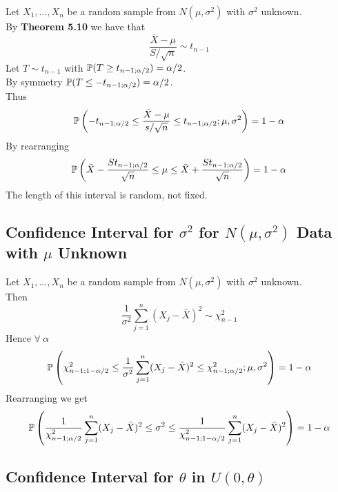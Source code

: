 \documentclass[11pt,a4paper]{article}
\begin{document}
Let $X_1,\dots,X_n$ be a random sample from $N(\mu,\sigma^2)$ with $\sigma^2$ unknown.\\
By \textbf{Theorem 5.10} we have that
$$\dfrac{\bar{X}-\mu}{S/\sqrt{n}}\sim t_{n-1}$$
Let $T\sim t_{n-1}$ with $\mathbb{P}(T\geq t_{n-1;\alpha/2})=\alpha/2$.\\
By symmetry $\mathbb{P}(T\leq-t_{n-1;\alpha/2})=\alpha/2$.\\
Thus
$$\mathbb{P}\left(-t_{n-1;\alpha/2}\leq\frac{\bar{X}-\mu}{s/\sqrt{n}}\leq t_{n-1;\alpha/2};\mu,\sigma^2\right)=1-\alpha$$
By rearranging
$$\mathbb{P}\left(\bar{X}-\frac{St_{n-1;\alpha/2}}{\sqrt{n}}\leq\mu\leq\bar{X}+\frac{St_{n-1;\alpha/2}}{\sqrt{n}}\right)=1-\alpha$$
\nb The length of this interval is random, not fixed.

\subsection{Confidence Interval for $\sigma^2$ for $N(\mu,\sigma^2)$ Data with $\mu$ Unknown}

Let $X_1,\dots,X_n$ be a random sample from $N(\mu,\sigma^2)$ with $\sigma^2$ unknown.\\
Then $$\frac{1}{\sigma^2}\sum_{j=1}^n(X_j-\bar{X})^2\sim\chi_{n-1}^2$$
Hence $\forall\ \alpha$
$$\mathbb{P}\left(\chi_{n-1;1-\alpha/2}^2\leq\frac{1}{\sigma^2}\sum_{j=1}^n(X_j-\bar{X})^2\leq\chi_{n-1;\alpha/2}^2;\mu,\sigma^2\right)=1-\alpha$$
Rearranging we get
$$\mathbb{P}\left(\frac{1}{\chi_{n-1;\alpha/2}^2}\sum_{j=1}^n(X_j-\bar{X})^2\leq\sigma^2\leq\frac{1}{\chi_{n-1;1-\alpha/2}^2}\sum_{j=1}^n(X_j-\bar{X})^2\right)=1-\alpha$$

\subsection{Confidence Interval for $\theta$ in $U(0,\theta)$}
\end{document}
